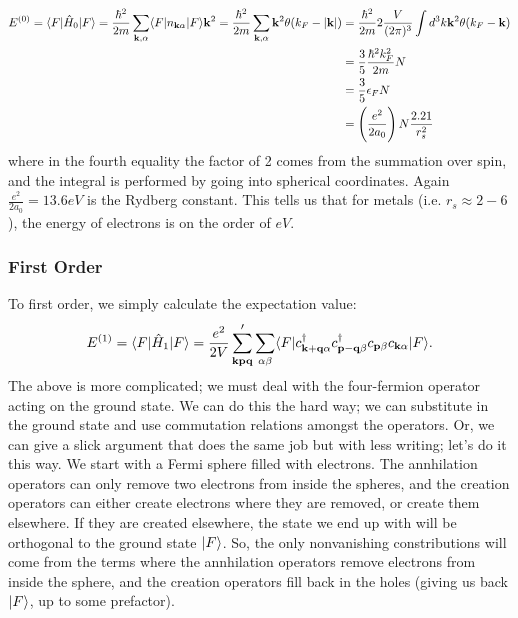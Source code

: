\begin{equation}
    \begin{split}
        E^{(0)} = \langle F \rvert\hat{H}_0\lvert F \rangle = \frac{\hbar^2}{2m}\sum_{\mathbf{k}, \alpha}\langle F \rvert n_{\mathbf{k}\alpha}\lvert F \rangle\mathbf{k}^2 = \frac{\hbar^2}{2m}\sum_{\mathbf{k}, \alpha}\mathbf{k}^2\theta(k_F - \lvert \mathbf{k} \rvert) &= \frac{\hbar^2}{2m}2\frac{V}{(2\pi)^3}\int d^3k \mathbf{k}^2\theta(k_F - \mathbf{k})
        \\ &= \frac{3}{5}\frac{\hbar^2k_F^2}{2m}N
        \\ &= \frac{3}{5}\epsilon_F N
        \\ &= \left(\frac{e^2}{2a_0}\right)N\frac{2.21}{r_s^2}
    \end{split}
\end{equation}
where in the fourth equality the factor of 2 comes from the summation over spin, and the integral is performed by going into spherical coordinates. Again $\frac{e^2}{2a_0} = 13.6\si{eV}$ is the Rydberg constant. This tells us that for metals (i.e. $r_s \approx 2-6$), the energy of electrons is on the order of $\si{eV}$.

\subsubsection{First Order}
To first order, we simply calculate the expectation value:
\begin{equation}
    E^{(1)} = \langle F \rvert\hat{H}_1\lvert F \rangle = \frac{e^2}{2V}\sum_{\mathbf{k}\mathbf{p}\mathbf{q}}'\sum_{\alpha\beta}\langle F \rvert c^\dagger_{\mathbf{k} + \mathbf{q}\alpha}c^{\dagger}_{\mathbf{p} - \mathbf{q}\beta}c_{\mathbf{p}\beta}c_{\mathbf{k}\alpha}\lvert F \rangle.
\end{equation}
The above is more complicated; we must deal with the four-fermion operator acting on the ground state. We can do this the hard way; we can substitute in the ground state and use commutation relations amongst the operators. Or, we can give a slick argument that does the same job but with less writing; let's do it this way. We start with a Fermi sphere filled with electrons. The annhilation operators can only remove two electrons from inside the spheres, and the creation operators can either create electrons where they are removed, or create them elsewhere. If they are created elsewhere, the state we end up with will be orthogonal to the ground state $\lvert F \rangle$. So, the only nonvanishing constributions will come from the terms where the annhilation operators remove electrons from inside the sphere, and the creation operators fill back in the holes (giving us back $\lvert F \rangle$, up to some prefactor).

